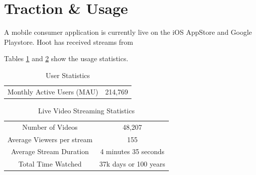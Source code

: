 \documentclass{article}
\begin{document}
\section{Traction \& Usage}
A mobile consumer application is currently live on the iOS AppStore and Google Playstore. Hoot has received streams from 


Tables \ref{table:1} and \ref{table:2} show the usage statistics.

\setlength{\arrayrulewidth}{.7mm}
\setlength{\tabcolsep}{18pt}
\renewcommand{\arraystretch}{2.0} 
 


\begin{table}[!htb]
\centering
\begin{tabular}{ |c|c| }
\hline
\rowcolor{lightgray} \multicolumn{2}{|c|}{User Statistics} \\
\hline
Monthly Active Users (MAU) & 214,769 \\
\hline
\end{tabular}
\caption{User Statistics}
\label{table:1}
\end{table}

\begin{table}[!htb]
\centering
\begin{tabular}{ |c|c| }
\hline
\rowcolor{lightgray} \multicolumn{2}{|c|}{Live Video Streaming Statistics} \\
\hline
Number of Videos & 48,207 \\
Average Viewers per stream & 155 \\
Average Stream Duration & 4 minutes 35 seconds \\
Total Time Watched & 37k days or 100 years \\
\hline
\end{tabular}
\caption{Live Video Streaming Statistics}
\label{table:2}
\end{table}

\end{document}

